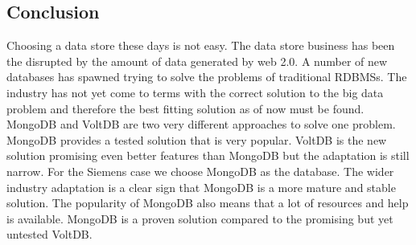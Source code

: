 \subsection{Conclusion}
Choosing a data store these days is not easy. The data store business has been the disrupted by the amount of data generated by web 2.0. 
A number of new databases has spawned trying to solve the problems of traditional RDBMSs. 
The industry has not yet come to terms with the correct solution to the big data problem and therefore the best fitting solution as of now must be found.
MongoDB and VoltDB are two very different approaches to solve one problem.
MongoDB provides a tested solution that is very popular. VoltDB is the new solution promising even better features than MongoDB but the adaptation is still narrow.
For the Siemens case we choose MongoDB as the database.
The wider industry adaptation is a clear sign that MongoDB is a more mature and stable solution.
The popularity of MongoDB also means that a lot of resources and help is available.
MongoDB is a proven solution compared to the promising but yet untested VoltDB.